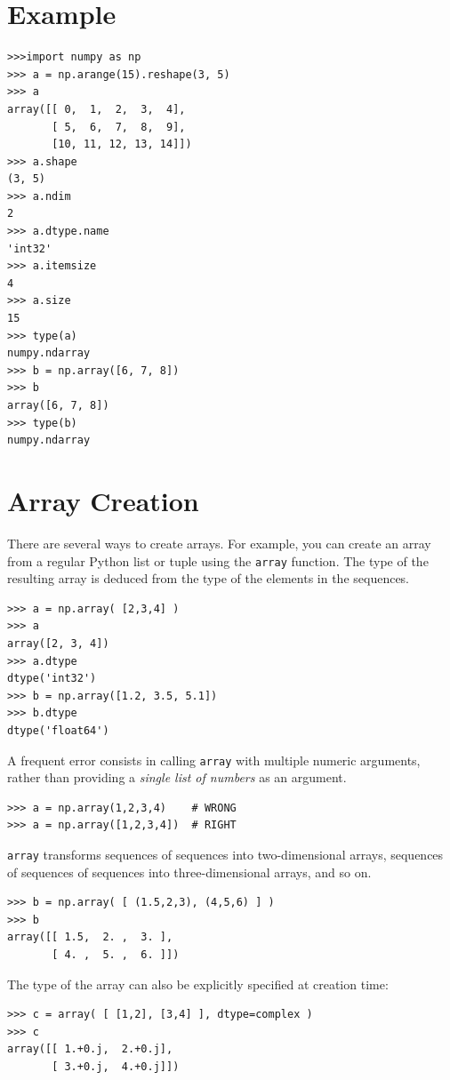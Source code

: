 \documentclass[12pt]{article}
\begin{document}
\section{Example}
\footnotesize
\begin{Verbatim}[frame=single]
>>>import numpy as np
>>> a = np.arange(15).reshape(3, 5)
>>> a
array([[ 0,  1,  2,  3,  4],
       [ 5,  6,  7,  8,  9],
       [10, 11, 12, 13, 14]])
>>> a.shape
(3, 5)
>>> a.ndim
2
>>> a.dtype.name
'int32'
>>> a.itemsize
4
>>> a.size
15
>>> type(a)
numpy.ndarray
>>> b = np.array([6, 7, 8])
>>> b
array([6, 7, 8])
>>> type(b)
numpy.ndarray
\end{Verbatim}
\normalsize

\section{Array Creation}
There are several ways to create arrays.
For example, you can create an array from a regular Python {list} or {tuple} using the  \texttt{array} function. The type of the resulting array is deduced from the type of the elements in the sequences.
\footnotesize
\begin{Verbatim}[frame=single]
>>> a = np.array( [2,3,4] )
>>> a
array([2, 3, 4])
>>> a.dtype
dtype('int32')
>>> b = np.array([1.2, 3.5, 5.1])
>>> b.dtype
dtype('float64')
\end{Verbatim}
\normalsize

A frequent error consists in calling \texttt{array} with multiple numeric arguments, rather than providing a \textit{single list of numbers} as an argument.
\footnotesize
\begin{Verbatim}[frame=single]
>>> a = np.array(1,2,3,4)    # WRONG
>>> a = np.array([1,2,3,4])  # RIGHT
\end{Verbatim}
\texttt{array} transforms sequences of sequences into two-dimensional arrays, sequences of sequences of sequences into three-dimensional arrays, and so on.
\footnotesize
\begin{Verbatim}[frame=single]
>>> b = np.array( [ (1.5,2,3), (4,5,6) ] )
>>> b
array([[ 1.5,  2. ,  3. ],
       [ 4. ,  5. ,  6. ]])
\end{Verbatim}
\normalsize

The type of the array can also be explicitly specified at creation time:
\footnotesize
\begin{Verbatim}[frame=single]
>>> c = array( [ [1,2], [3,4] ], dtype=complex )
>>> c
array([[ 1.+0.j,  2.+0.j],
       [ 3.+0.j,  4.+0.j]])
\end{Verbatim}
\normalsize
\end{document}

